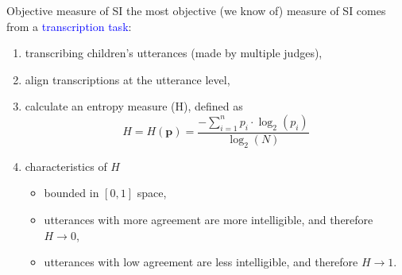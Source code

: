 \begin{frame}
	{Objective measure of SI}
	the \alert{most objective (we know of)} measure of SI comes from a \textcolor{blue}{transcription task}:
	
	\begin{enumerate}
		\item transcribing children's utterances (made by multiple judges),
		\item align transcriptions at the utterance level,
		\item calculate an entropy measure (H), defined as
		\begin{equation*} \label{eq:entropy}
			H = H(\pmb{p}) = \frac{-\sum_{i=1}^{n} p_{i} \cdot \log_{2}(p_{i})}{\log_{2}(N)}
		\end{equation*}
		\item characteristics of $H$ \citep{Boonen_et_al_2021, Faes_et_al_2021} 
		\begin{itemize}
			\item  bounded in $[0,1]$ space,
			\item utterances with more agreement are more intelligible, and therefore $H \rightarrow 0$,
			\item utterances with low agreement are less intelligible, and therefore $H \rightarrow 1$.
		\end{itemize}
	\end{enumerate}
\end{frame}
%
%
